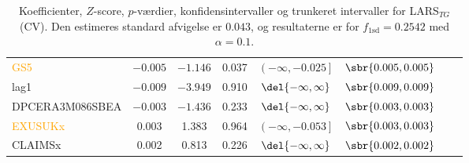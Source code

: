 \begin{table}[ht]
{\begin{tabular}{lccccccc}
\textcolor{orange}{GS5} & $-0.005$ & $-1.146 $ &0.037 &     $\left( -\infty ,  -0.025\right]   $ & $\sbr{0.005 ,0.005 }$\\  
 \textcolor{blue3}{lag1}  & $-0.009$  &$-3.949$   & 0.910   & $\del{-\infty  ,  \infty }$  &$\sbr{0.009, 0.009 }$ \\ 
 \textcolor{red3}{DPCERA3M086SBEA} & $- 0.003$ & $-1.436$ & 0.233  &   $\del{-\infty   ,  \infty }$ &  $\sbr{0.003, 0.003}$ \\ 
\textcolor{orange}{ EXUSUKx}  &  0.003   &1.383 & 0.964   &   $\left( -\infty     ,-0.053 \right] $&  $\sbr{0.003, 0.003 }$   \\   
 \textcolor{blue3}{CLAIMSx} &0.002 &  0.813   & 0.226 &    $\del{-\infty  ,  \infty}$& $\sbr{0.002 ,0.002 }$   \\ 
\bottomrule
\end{tabular}  
}
\caption{Koefficienter, \(Z\)-score, \(p\)-værdier, konfidensintervaller og trunkeret intervaller for LARS$_{TG}$ (CV). Den estimeres standard afvigelse er \(0.043\), og resultaterne er for \(f_{1 \text{sd}} = 0.2542\) med \(\alpha = 0.1\).} \label{tab:larInf_kryds}
\end{table} 
